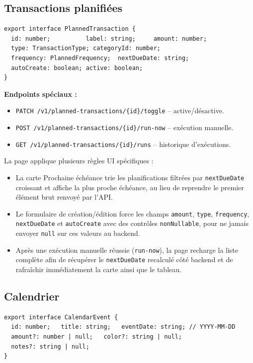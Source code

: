 \documentclass[12pt,a4paper]{article}
\begin{document}
\subsection{Transactions planifiées}

\begin{lstlisting}
export interface PlannedTransaction {
  id: number;          label: string;     amount: number;
  type: TransactionType; categoryId: number;
  frequency: PlannedFrequency;  nextDueDate: string;
  autoCreate: boolean; active: boolean;
}
\end{lstlisting}

\textbf{Endpoints spéciaux :}
\begin{itemize}
  \item \texttt{PATCH /v1/planned-transactions/\{id\}/toggle} -- active/désactive.
  \item \texttt{POST /v1/planned-transactions/\{id\}/run-now} -- exécution manuelle.
  \item \texttt{GET /v1/planned-transactions/\{id\}/runs} -- historique d'exécutions.
\end{itemize}

La page applique plusieurs règles UI spécifiques :
\begin{itemize}
  \item La carte \og Prochaine échéance \fg{} trie les planifications filtrées
        par \texttt{nextDueDate} croissant et affiche la plus proche échéance,
        au lieu de reprendre le premier élément brut renvoyé par l'API.
  \item Le formulaire de création/édition force les champs
        \texttt{amount}, \texttt{type}, \texttt{frequency},
        \texttt{nextDueDate} et \texttt{autoCreate} avec des contrôles
        \texttt{nonNullable}, pour ne jamais envoyer \texttt{null} sur ces
        valeurs au backend.
  \item Après une exécution manuelle réussie (\texttt{run-now}), la page recharge
        la liste complète afin de récupérer le \texttt{nextDueDate} recalculé
        côté backend et de rafraîchir immédiatement la carte ainsi que le tableau.
\end{itemize}

\subsection{Calendrier}

\begin{lstlisting}
export interface CalendarEvent {
  id: number;   title: string;   eventDate: string; // YYYY-MM-DD
  amount?: number | null;   color?: string | null;
  notes?: string | null;
}
\end{lstlisting}
\end{document}
